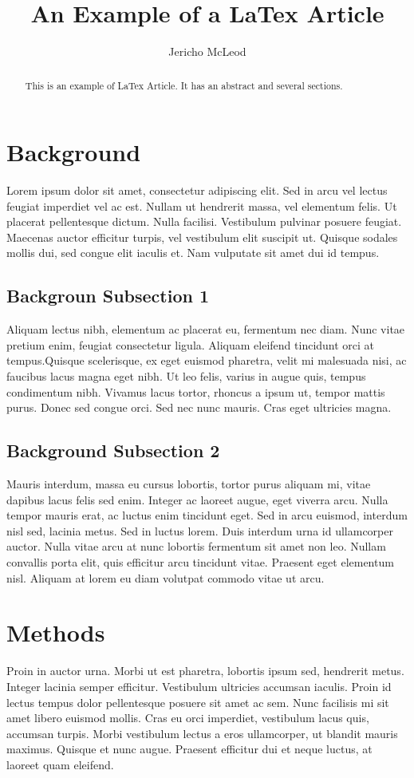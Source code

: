 \documentclass[11pt, onecolumn]{article}
\title{An Example of a LaTex Article}
\author{Jericho McLeod}
\begin{document}
\maketitle

\begin{abstract}
This is an example of  LaTex Article. It has an abstract and several sections.
\end{abstract}

\section{Background}
Lorem ipsum dolor sit amet, consectetur adipiscing elit. Sed in arcu vel lectus feugiat imperdiet vel ac est. Nullam ut hendrerit massa, vel elementum felis. Ut placerat pellentesque dictum. Nulla facilisi. Vestibulum pulvinar posuere feugiat. Maecenas auctor efficitur turpis, vel vestibulum elit suscipit ut. Quisque sodales mollis dui, sed congue elit iaculis et. Nam vulputate sit amet dui id tempus. 

\subsection{Backgroun Subsection 1}
Aliquam lectus nibh, elementum ac placerat eu, fermentum nec diam. Nunc vitae pretium enim, feugiat consectetur ligula. Aliquam eleifend tincidunt orci at tempus.Quisque scelerisque, ex eget euismod pharetra, velit mi malesuada nisi, ac faucibus lacus magna eget nibh. Ut leo felis, varius in augue quis, tempus condimentum nibh. Vivamus lacus tortor, rhoncus a ipsum ut, tempor mattis purus. Donec sed congue orci. Sed nec nunc mauris. Cras eget ultricies magna.

\subsection{Background Subsection 2} 
 Mauris interdum, massa eu cursus lobortis, tortor purus aliquam mi, vitae dapibus lacus felis sed enim. Integer ac laoreet augue, eget viverra arcu. Nulla tempor mauris erat, ac luctus enim tincidunt eget. Sed in arcu euismod, interdum nisl sed, lacinia metus. Sed in luctus lorem. Duis interdum urna id ullamcorper auctor. Nulla vitae arcu at nunc lobortis fermentum sit amet non leo. Nullam convallis porta elit, quis efficitur arcu tincidunt vitae. Praesent eget elementum nisl. Aliquam at lorem eu diam volutpat commodo vitae ut arcu.

\section{Methods}
Proin in auctor urna. Morbi ut est pharetra, lobortis ipsum sed, hendrerit metus. Integer lacinia semper efficitur. Vestibulum ultricies accumsan iaculis. Proin id lectus tempus dolor pellentesque posuere sit amet ac sem. Nunc facilisis mi sit amet libero euismod mollis. Cras eu orci imperdiet, vestibulum lacus quis, accumsan turpis. Morbi vestibulum lectus a eros ullamcorper, ut blandit mauris maximus. Quisque et nunc augue. Praesent efficitur dui et neque luctus, at laoreet quam eleifend. 
\end{document}
